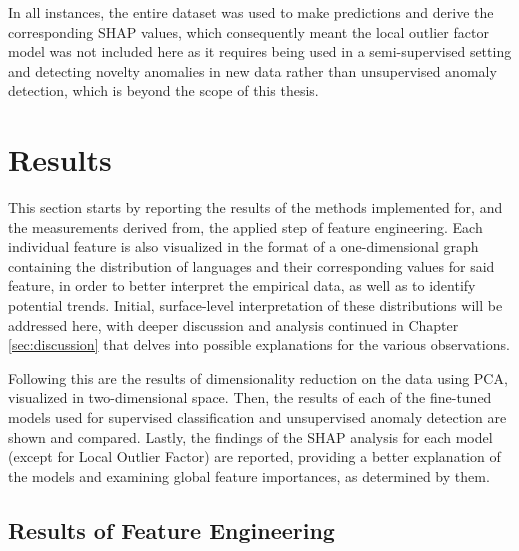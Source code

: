 \documentclass[12pt,a4paper]{article}
\numberwithin{figure}{section}
\numberwithin{table}{section}
\numberwithin{definition}{section}
\begin{document}
In all instances, the entire dataset was used to make predictions and derive the corresponding SHAP values, which consequently meant the local outlier factor model was not included here as it requires being used in a semi-supervised setting and detecting novelty anomalies in new data rather than unsupervised anomaly detection, which is beyond the scope of this thesis.

\newpage
\section{Results}
\label{sec:results}

This section starts by reporting the results of the methods implemented for, and the measurements derived from, the applied step of feature engineering. Each individual feature is also visualized in the format of a one-dimensional graph containing the distribution of languages and their corresponding values for said feature, in order to better interpret the empirical data, as well as to identify potential trends. Initial, surface-level interpretation of these distributions will be addressed here, with deeper discussion and analysis continued in Chapter \ref{sec:discussion} that delves into possible explanations for the various observations.

Following this are the results of dimensionality reduction on the data using PCA, visualized in two-dimensional space. Then, the results of each of the fine-tuned models used for supervised classification and unsupervised anomaly detection are shown and compared. Lastly, the findings of the SHAP analysis for each model (except for Local Outlier Factor) are reported, providing a better explanation of the models and examining global feature importances, as determined by them.

\subsection{Results of Feature Engineering}
\label{ssec:featureengineeringresults}

\end{document}
